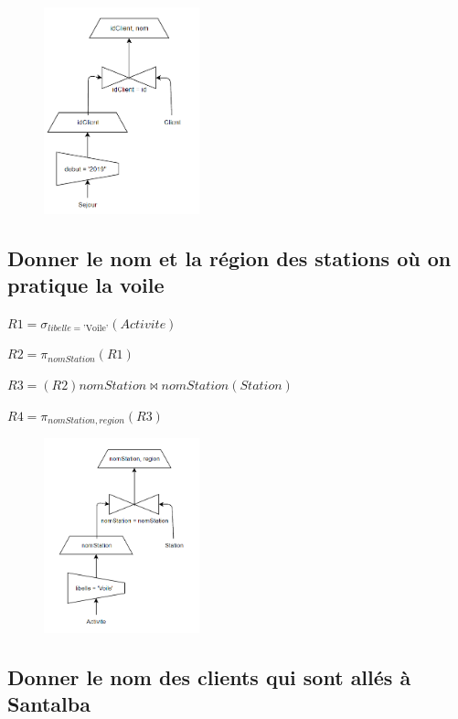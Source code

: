 \documentclass{article}
\begin{document}
\begin{figure}[H]
  \centering
  \includegraphics[width=0.4\textwidth]{imgAlgGraph/10.png}
  \label{fig:10}
\end{figure}

\subsection{Donner le nom et la région des stations où on pratique la voile}

$ R1 = \sigma_{libelle = \text{'Voile'}}(Activite)$

$ R2 = \pi_{nomStation}(R1)$

$ R3 = (R2)nomStation \Join nomStation(Station)$

$ R4 = \pi_{nomStation, region}(R3)$

\begin{figure}[H]
  \centering
  \includegraphics[width=0.4\textwidth]{imgAlgGraph/11.png}
  \label{fig:11}
\end{figure}

\subsection{Donner le nom des clients qui sont allés à Santalba}
\end{document}

